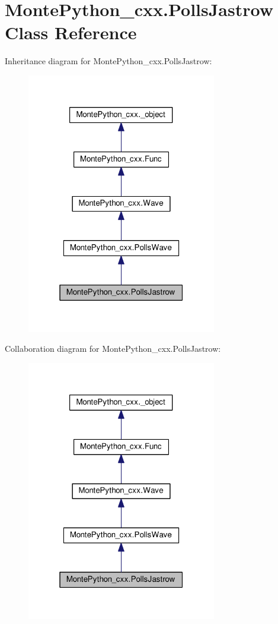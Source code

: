 \hypertarget{classMontePython__cxx_1_1PollsJastrow}{}\section{Monte\+Python\+\_\+cxx.\+Polls\+Jastrow Class Reference}
\label{classMontePython__cxx_1_1PollsJastrow}


Inheritance diagram for Monte\+Python\+\_\+cxx.\+Polls\+Jastrow\+:
\nopagebreak
\begin{figure}[H]
\begin{center}
\leavevmode
\includegraphics[width=235pt]{classMontePython__cxx_1_1PollsJastrow__inherit__graph}
\end{center}
\end{figure}


Collaboration diagram for Monte\+Python\+\_\+cxx.\+Polls\+Jastrow\+:
\nopagebreak
\begin{figure}[H]
\begin{center}
\leavevmode
\includegraphics[width=235pt]{classMontePython__cxx_1_1PollsJastrow__coll__graph}
\end{center}
\end{figure}

